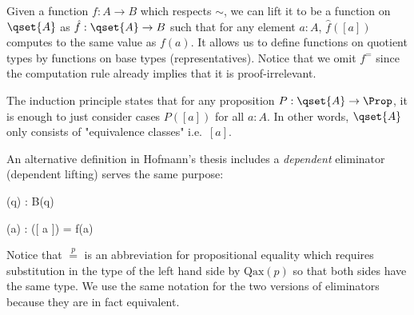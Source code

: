 Given a function $f : A \to B$ which respects $\sim$, we can lift it to be a function on $\qset{A}$ as $\hat{f} : \qset{A} \to B$ such that for any element $a : A$, $\hat{f}([ a ])$ computes to the same value as $f(a)$. It allows us to define functions on quotient types by functions on base types (representatives).
Notice that we omit $f^=$ since the computation rule already implies that it is proof-irrelevant.

The induction principle states that for any proposition $P : \qset{A} \to \Prop$, it is enough to just consider cases $ P([ a ])$ for all $a : A$. In other words, $\qset{A}$ only consists of "equivalence classes" i.e.\ $[ a ]$.


An alternative definition in Hofmann's thesis \cite{hof:phd} includes a \emph{dependent} eliminator (dependent lifting) serves the same purpose:

{\Gamma \vdash {}(q) : B(q)}

{\Gamma \vdash {} (a)  : ([ a ]) = f(a) }


Notice that $\stackrel{p}{=}$ is an abbreviation for propositional equality which requires substitution in the type of the left hand side by $\text{Qax}(p)$ so that both sides have the same type.
We use the same notation for the two versions of eliminators because they are in fact equivalent.

